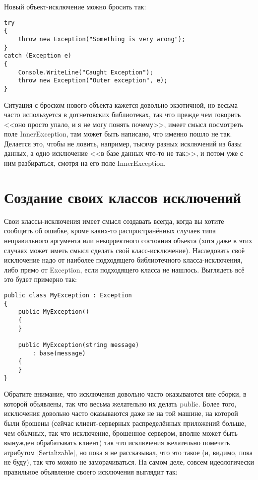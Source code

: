 \documentclass{../../text-style}
\begin{document}
Новый объект-исключение можно бросить так:

\begin{verbatim}
try
{
    throw new Exception("Something is very wrong");
}
catch (Exception e)
{
    Console.WriteLine("Caught Exception");
    throw new Exception("Outer exception", e);
}
\end{verbatim}

Ситуация с броском нового объекта кажется довольно экзотичной, но весьма часто используется в дотнетовских библиотеках, так что прежде чем говорить <<оно просто упало, и я не могу понять почему>>, имеет смысл посмотреть поле InnerException, там может быть написано, что именно пошло не так. Делается это, чтобы не ловить, например, тысячу разных исключений из базы данных, а одно исключение <<в базе данных что-то не так>>, и потом уже с ним разбираться, смотря на его поле InnerException.

\section{Создание своих классов исключений}

Свои классы-исключения имеет смысл создавать всегда, когда вы хотите сообщить об ошибке, кроме каких-то распространённых случаев типа неправильного аргумента или некорректного состояния объекта (хотя даже в этих случаях может иметь смысл сделать свой класс-исключение). Наследовать своё исключение надо от наиболее подходящего библиотечного класса-исключения, либо прямо от Exception, если подходящего класса не нашлось. Выглядеть всё это будет примерно так:

\begin{verbatim}
public class MyException : Exception
{
    public MyException() 
    {
    }

    public MyException(string message)
        : base(message)
    {
    }
}
\end{verbatim}

Обратите внимание, что исключения довольно часто оказываются вне сборки, в которой объявлены, так что весьма желательно их делать public. Более того, исключения довольно часто оказываются даже не на той машине, на которой были брошены (сейчас клиент-серверных распределённых приложений больше, чем обычных, так что исключение, брошенное сервером, вполне может быть вынужден обрабатывать клиент) так что исключения желательно помечать атрибутом [Serializable], но пока я не рассказывал, что это такое (и, видимо, пока не буду), так что можно не заморачиваться. На самом деле, совсем идеологически правильное объявление своего исключения выглядит так:
\end{document}
